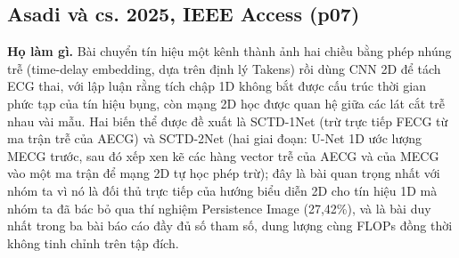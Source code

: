 \documentclass[12pt,a4paper]{article}
\begin{document}
\subsection{Asadi và cs. 2025, IEEE Access \normalfont\small (p07)}
\par\vspace{2pt}
\par\vspace{4pt}
\noindent \textbf{Họ làm gì.} Bài chuyển tín hiệu một kênh thành ảnh hai chiều bằng phép nhúng trễ (time-delay embedding, dựa trên định lý Takens) rồi dùng CNN 2D để tách ECG thai, với lập luận rằng tích chập 1D không bắt được cấu trúc thời gian phức tạp của tín hiệu bụng, còn mạng 2D học được quan hệ giữa các lát cắt trễ nhau vài mẫu. Hai biến thể được đề xuất là SCTD-1Net (trừ trực tiếp FECG từ ma trận trễ của AECG) và SCTD-2Net (hai giai đoạn: U-Net 1D ước lượng MECG trước, sau đó xếp xen kẽ các hàng vector trễ của AECG và của MECG vào một ma trận để mạng 2D tự học phép trừ); đây là bài quan trọng nhất với nhóm ta vì nó là đối thủ trực tiếp của hướng biểu diễn 2D cho tín hiệu 1D mà nhóm ta đã bác bỏ qua thí nghiệm Persistence Image (27,42\%), và là bài duy nhất trong ba bài báo cáo đầy đủ số tham số, dung lượng cùng FLOPs đồng thời không tinh chỉnh trên tập đích.\par\vspace{3pt}
\end{document}
